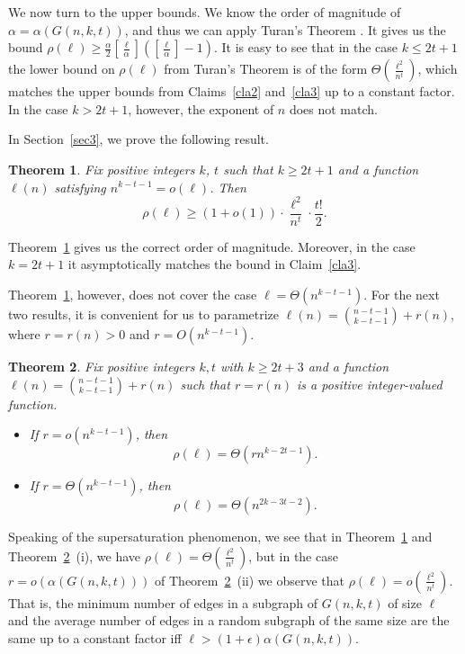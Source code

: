 \documentclass[12pt,a4paper]{article}
\newtheorem{Theorem}{Theorem}
\begin{document}
We now turn to the upper bounds. We know the order of magnitude of $\alpha = \alpha(G(n,k,t))$, and thus we can apply Turan's Theorem \cite{TT}. It gives us the bound
$\rho(\ell) \geqslant \frac{\alpha}{2}\left[\frac{\ell}{\alpha}\right](\left[\frac{\ell}{\alpha}\right]-1).$ It is easy to see that in the case $k \leqslant 2t+1$ the lower bound on $\rho(\ell)$ from Turan's Theorem is of the form  $\Theta(\frac{\ell^2}{n^t})$, which matches  the upper bounds from Claims~\ref{cla2} and~\ref{cla3} up to a constant factor. In the case $k > 2t+1$, however, the exponent of $n$ does not match.

In Section~\ref{sec3}, we prove the following result.

\begin{Theorem}\label{thm4}
Fix positive integers $k$, $t$ such that $k \geqslant 2t+1$ and a function $\ell(n)$ satisfying $n^{k-t-1} = o(\ell)$. Then
$$\rho(\ell) \geqslant (1+o(1)) \cdot \frac{\ell^{2}}{n^{t}} \cdot \frac{t!}{2}.$$
\end{Theorem}

Theorem~\ref{thm4} gives us the correct order of magnitude. Moreover, in the case $k=2t+1$ it asymptotically matches the bound in Claim~\ref{cla3}.

Theorem~\ref{thm4}, however, does not cover the case $\ell = \Theta(n^{k-t-1}).$ For the next two results, it is convenient for us to parametrize $\ell(n) = \binom{n-t-1}{k-t-1} + r(n),$ where $r=r(n) > 0$ and $r= O(n^{k-t-1})$.


\begin{Theorem}\label{thm5}  Fix positive integers $k,t$ with $k \geqslant 2t+3$ and a function $\ell(n) = \binom{n-t-1}{k-t-1} + r(n)$ such that $r=r(n)$ is a positive integer-valued function.
\begin{itemize}
    \item[(i)]If $r=o(n^{k-t-1})$, then 
    $$\rho(\ell) = \Theta (r n^{k-2t-1}).$$
    \item[(ii)] If $r=\Theta(n^{k-t-1})$, then
    $$\rho(\ell) = \Theta (n^{2k-3t-2}).$$
\end{itemize}
\end{Theorem}
Speaking of the supersaturation phenomenon, we see that in Theorem~\ref{thm4} and Theorem~\ref{thm5}~(i), we have $\rho(\ell) = \Theta(\frac{\ell^2}{n^{t}})$, but in the case $r=o(\alpha(G(n,k,t)))$ of Theorem~\ref{thm5}~(ii) we observe that $\rho(\ell)=o(\frac{\ell^2}{n^t})$. That is, the minimum number of edges in a subgraph of $G(n,k,t)$ of size $\ell$ and the average number of edges in a random subgraph of the same size are the same up to a constant factor iff $\ell>(1+\epsilon)\alpha(G(n,k,t)).$
\end{document}
